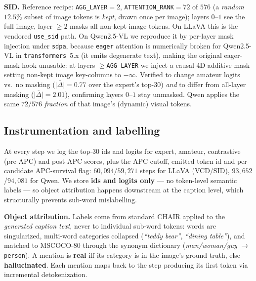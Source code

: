 \textbf{SID.} Reference recipe: \texttt{AGG\_LAYER}$=2$,
\texttt{ATTENTION\_RANK}$=72$ of $576$ (a \emph{random} $12.5\%$ subset of image
tokens is \emph{kept}, drawn once per image); layers $0$--$1$ see the full
image, layer $\ge2$ masks all non-kept image tokens. On LLaVA this is the
vendored \texttt{use\_sid} path. On Qwen2.5-VL we reproduce it by per-layer
mask injection under \texttt{sdpa}, because \texttt{eager} attention is
numerically broken for Qwen2.5-VL in \texttt{transformers}~5.x (it emits
degenerate text), making the original eager-mask hook unusable: at layers
$\ge$\texttt{AGG\_LAYER} we inject a causal 4D additive mask setting non-kept
image key-columns to $-\infty$. Verified to change amateur logits vs.\ no
masking ($\overline{|\Delta|}=0.77$ over the expert's top-$30$) \emph{and} to
differ from all-layer masking ($\overline{|\Delta|}=2.01$), confirming layers
$0$--$1$ stay unmasked. Qwen applies the same $72/576$ \emph{fraction} of that
image's (dynamic) visual tokens.

\subsection{Instrumentation and labelling}
\label{subsec:cdmech-capture}

At every step we log the top-$30$ ids and logits for expert, amateur,
contrastive (pre-APC) and post-APC scores, plus the APC cutoff, emitted token id
and per-candidate APC-survival flag: $60{,}094$/$59{,}271$ steps for LLaVA
(VCD/SID), $93{,}652$/$94{,}081$ for Qwen. We store \textbf{ids and logits
only} --- no token-level semantic labels --- so object attribution happens
downstream at the caption level, which structurally prevents sub-word
mislabelling.

\textbf{Object attribution.} Labels come from standard CHAIR applied to the
\emph{generated caption text}, never to individual sub-word tokens: words are
singularized, multi-word categories collapsed (\emph{``teddy bear''},
\emph{``dining table''}), and matched to MSCOCO-80 through the synonym
dictionary (\emph{man/woman/guy} $\to$ \texttt{person}). A mention is
\textbf{real} iff its category is in the image's ground truth, else
\textbf{hallucinated}. Each mention maps back to the step producing its first
token via incremental detokenization.

